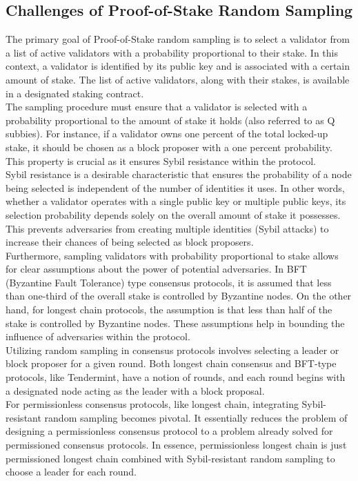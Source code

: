 \subsection{Challenges of Proof-of-Stake Random Sampling}
The primary goal of Proof-of-Stake random sampling is to select a validator from a list of active validators with a probability proportional to their stake. In this context, a validator is identified by its public key and is associated with a certain amount of stake. The list of active validators, along with their stakes, is available in a designated staking contract.\\
The sampling procedure must ensure that a validator is selected with a probability proportional to the amount of stake it holds (also referred to as Q subbies). For instance, if a validator owns one percent of the total locked-up stake, it should be chosen as a block proposer with a one percent probability. This property is crucial as it ensures Sybil resistance within the protocol.\\
Sybil resistance is a desirable characteristic that ensures the probability of a node being selected is independent of the number of identities it uses. In other words, whether a validator operates with a single public key or multiple public keys, its selection probability depends solely on the overall amount of stake it possesses. This prevents adversaries from creating multiple identities (Sybil attacks) to increase their chances of being selected as block proposers.\\
Furthermore, sampling validators with probability proportional to stake allows for clear assumptions about the power of potential adversaries. In BFT (Byzantine Fault Tolerance) type consensus protocols, it is assumed that less than one-third of the overall stake is controlled by Byzantine nodes. On the other hand, for longest chain protocols, the assumption is that less than half of the stake is controlled by Byzantine nodes. These assumptions help in bounding the influence of adversaries within the protocol.\\
Utilizing random sampling in consensus protocols involves selecting a leader or block proposer for a given round. Both longest chain consensus and BFT-type protocols, like Tendermint, have a notion of rounds, and each round begins with a designated node acting as the leader with a block proposal.\\
For permissionless consensus protocols, like longest chain, integrating Sybil-resistant random sampling becomes pivotal. It essentially reduces the problem of designing a permissionless consensus protocol to a problem already solved for permissioned consensus protocols. In essence, permissionless longest chain is just permissioned longest chain combined with Sybil-resistant random sampling to choose a leader for each round.\\
